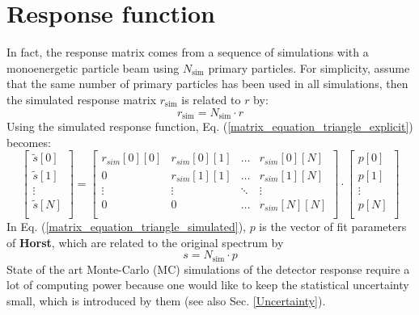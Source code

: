 \documentclass{article}
\begin{document}
\section{Response function}
In fact, the response matrix comes from a sequence of simulations with a monoenergetic particle beam using $N_\mathrm{sim}$ primary particles. For simplicity, assume that the same number of primary particles has been used in all simulations, then the simulated response matrix $r_\mathrm{sim}$ is related to $r$ by:
%
\begin{equation}
	r_\mathrm{sim} = N_\mathrm{sim} \cdot r
\end{equation}
%
Using the simulated response function, Eq. (\ref{matrix_equation_triangle_explicit}) becomes:
%
\begin{equation}
	\label{matrix_equation_triangle_simulated}
	\left[ 
		\begin{array}{c}
			\tilde{s}[0] \\
			\tilde{s}[1] \\
			\vdots	\\
			\tilde{s}[N] \\
		\end{array}
	\right]
	= 
	\begin{bmatrix}
		r_{sim}[0][0] & r_{sim}[0][1] & \hdots & r_{sim}[0][N] \\
		0       & r_{sim}[1][1] & \hdots & r_{sim}[1][N] \\
		\vdots  & \vdots  & \ddots & \vdots  \\
		0       & 0       & \hdots & r_{sim}[N][N] \\
	\end{bmatrix}
	\cdot
	\left[ 
		\begin{array}{c}
			p[0] \\
			p[1] \\
			\vdots	\\
			p[N] \\
		\end{array}
	\right]
\end{equation}
%
In Eq. (\ref{matrix_equation_triangle_simulated}), $p$ is the vector of fit parameters of \textbf{Horst}, which are related to the original spectrum by
%
\begin{equation}
	s = N_\mathrm{sim} \cdot p
\end{equation}
%
State of the art Monte-Carlo (MC) simulations of the detector response require a lot of computing power because one would like to keep the statistical uncertainty small, which is introduced by them (see also Sec. \ref{Uncertainty}).
\end{document}
